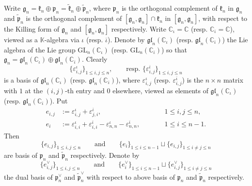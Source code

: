 \documentclass[12pt, a4paper]{amsart}
\newcommand{\GL}{{\mathrm{GL}}}
\newcommand{\C}{\mathbb{C}}
\newcommand{\K}{\mathbb{K}}
\theoremstyle{Theorem}
\theoremstyle{Theorem}
\theoremstyle{Theorem}
\theoremstyle{Theorem}
\theoremstyle{Plain}
\theoremstyle{Definition}
\begin{document}
	Write $\mathfrak{g}_n=\mathfrak{k}_n\oplus\mathfrak{p}_n=\widetilde{\mathfrak{k}}_n\oplus\widetilde{\mathfrak{p}}_n$,  where $\mathfrak{p}_n$ is the orthogonal complement of $\mathfrak{k}_n$ in $\mathfrak{g}_n$ and $\widetilde{\mathfrak{p}}_n$ is the orthogonal complement of $[\mathfrak{g}_n,\mathfrak{g}_n]\cap\mathfrak{k}_n$ in $[\mathfrak{g}_n,\mathfrak{g}_n]$, with respect to the Killing form of $\mathfrak{g}_n$ and $[\mathfrak{g}_n,\mathfrak{g}_n]$ respectively. Write $\C_{\iota}=\C$ (resp. $\C_{\overline{\iota}}=\C$), viewed as a $\K$-algebra via $\iota$ (resp. $\overline{\iota}$). Denote by $\mathfrak{gl}_n(\C_{\iota})$ (resp. $\mathfrak{gl}_n(\C_{\overline{\iota}})$) the Lie algebra of the Lie group $\GL_n(\C_{\iota})$ (resp. $\GL_n(\C_{\overline{\iota}})$) so that $\mathfrak{g}_n=\mathfrak{gl}_n(\C_{\iota})\oplus\mathfrak{gl}_n(\C_{\overline{\iota}})$. Clearly
	\[
	\{\varepsilon_{i,j}^{\iota}\}_{1\leq i,j\leq n},\qquad\text{resp. }\{\varepsilon_{i,j}^{\overline{\iota}}\}_{1\leq i,j\leq n}
	\]
	is a basis of $\mathfrak{gl}_n(\C_{\iota})$ (resp. $\mathfrak{gl}_n(\C_{\overline{\iota}})$), where $\varepsilon_{i,j}^{\iota}$ (resp. $\varepsilon_{i,j}^{\overline{\iota}}$) is the $n\times n$ matrix with $1$ at the $(i,j)$-th entry and $0$ elsewhere, viewed as elements of $\mathfrak{gl}_n(\C_{\iota})$ (resp. $\mathfrak{gl}_n(\C_{\overline{\iota}})$). Put
	\[
	\begin{aligned}
		e_{i,j}&:=\varepsilon_{i,j}^{\iota}+\varepsilon_{j,i}^{\overline{\iota}}, &\qquad & 1\leq i,j\leq n, \\
		e_{i}&:=\varepsilon_{i,i}^{\iota}+\varepsilon_{i,i}^{\overline{\iota}}-\varepsilon_{n,n}^{\iota}-\varepsilon_{n,n}^{\overline{\iota}},&\qquad& 1\leq i\leq n-1.
	\end{aligned}
	\]
	Then
	\[
	\{e_{i,j}\}_{1\leq i,j\leq n}\qquad\text{and}\qquad\{e_i\}_{1\leq i\leq n-1}\sqcup \{e_{i,j}\}_{1\leq i\neq j\leq n}
	\]
	are basis of $\mathfrak{p}_n$ and $\widetilde{\mathfrak{p}}_n$ respectively. Denote by 
	\[
	\{e^{\vee}_{i,j}\}_{1\leq i,j\leq n}\qquad\text{and}\qquad\{e^{\vee}_i\}_{1\leq i\leq n-1}\sqcup \{e^{\vee}_{i,j}\}_{1\leq i\neq j\leq n}
	\]
	the dual basis of $\mathfrak{p}^{\vee}_n$ and $\widetilde{\mathfrak{p}}^{\vee}_n$ with respect to above basis of $\mathfrak{p}_n$ and $\widetilde{\mathfrak{p}}_n$ respectively.
	
\end{document}
